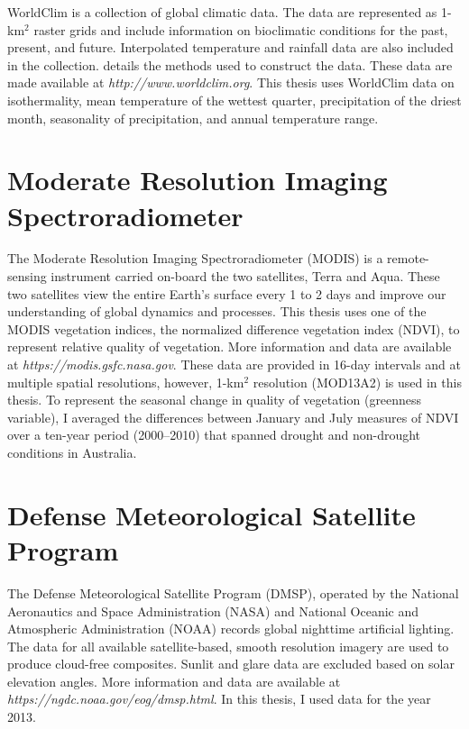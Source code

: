 WorldClim is a collection of global climatic data. The data are represented as 1-km$^2$ raster grids and include information on bioclimatic conditions for the past, present, and future. Interpolated temperature and rainfall data are also included in the collection. \cite{hijm05} details the methods used to construct the data. These data are made available at \textit{http://www.worldclim.org}. This thesis uses WorldClim data on isothermality, mean temperature of the wettest quarter, precipitation of the driest month, seasonality of precipitation, and annual temperature range.

\section{Moderate Resolution Imaging Spectroradiometer}

The Moderate Resolution Imaging Spectroradiometer (MODIS) is a remote-sensing instrument carried on-board the two satellites, Terra and Aqua. These two satellites view the entire Earth's surface every 1 to 2 days and improve our understanding of global dynamics and processes. This thesis uses one of the MODIS vegetation indices, the normalized difference vegetation index (NDVI), to represent relative quality of vegetation. More information and data are available at \textit{https://modis.gsfc.nasa.gov}. These data are provided in 16-day intervals and at multiple spatial resolutions, however, 1-km$^2$ resolution (MOD13A2) is used in this thesis. To represent the seasonal change in quality of vegetation (greenness variable), I averaged the differences between January and July measures of NDVI over a ten-year period (2000--2010) that spanned drought and non-drought conditions in Australia.

\section{Defense Meteorological Satellite Program}

The Defense Meteorological Satellite Program (DMSP), operated by the National Aeronautics and Space Administration (NASA) and National Oceanic and Atmospheric Administration (NOAA) records global nighttime artificial lighting. The data for all available satellite-based, smooth resolution imagery are used to produce cloud-free composites. Sunlit and glare data are excluded based on solar elevation angles. More information and data are available at \textit{https://ngdc.noaa.gov/eog/dmsp.html}. In this thesis, I used data for the year 2013.

